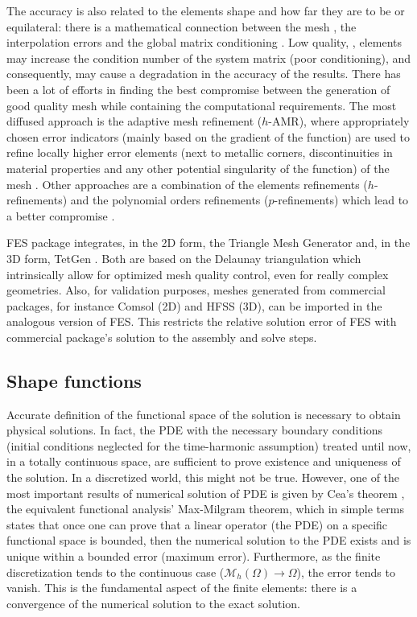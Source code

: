 The accuracy is also related to the elements shape and how far they are to be  or equilateral: there is a mathematical connection between the mesh , the interpolation errors and the global matrix conditioning \cite{tsukerman1998comparison}. Low quality, , elements may increase the condition number of the system matrix (poor conditioning), and consequently, may cause a degradation in the accuracy of the results. There has been a lot of efforts in finding the best compromise between the generation of good quality mesh while containing the computational requirements. The most diffused approach is the adaptive mesh refinement ($h$-AMR), where appropriately chosen error indicators (mainly based on the gradient of the function) are used to refine locally higher error elements (next to metallic corners, discontinuities in material properties and any other potential singularity of the function) of the mesh \cite{sun2000adaptive,ingelstrom2004higher}. Other approaches are a combination of the elements refinements ($h$-refinements) and the polynomial orders refinements ($p$-refinements) which lead to a better compromise \cite{solin2010adaptive}.

FES package integrates, in the 2D form, the Triangle Mesh Generator \cite{shewchuk2002delaunay} and, in the 3D form, TetGen \cite{si2008three}. Both are based on the Delaunay triangulation which intrinsically allow for optimized mesh quality control, even for really complex geometries. Also, for validation purposes, meshes generated from commercial packages, for instance Comsol (2D) and HFSS (3D), can be imported  in the analogous version of FES. This restricts the relative solution error of FES with commercial package's solution to the assembly and solve steps.


\subsection{Shape functions}

Accurate definition of the functional space of the solution is necessary to obtain physical solutions. In fact, the PDE with the necessary boundary conditions (initial conditions neglected for the time-harmonic assumption) treated until now, in a totally continuous space, are sufficient to prove existence and uniqueness of the solution. In a discretized world, this might not be true. However, one of the most important results of numerical solution of PDE is given by Cea's theorem \cite{ciarlet1978finite}, the equivalent functional analysis' Max-Milgram theorem, which in simple terms states that once one can prove that a linear operator (the PDE) on a specific functional space is bounded, then the numerical solution to the PDE exists and is unique within a bounded error (maximum error). Furthermore, as the finite discretization tends to the continuous case ($\mathcal{M}_h(\Omega) \rightarrow \Omega$), the error tends to vanish. This is the fundamental aspect of the finite elements: there is a convergence of the numerical solution to the exact solution. 

